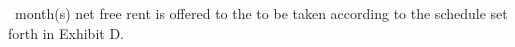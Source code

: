 \monthsFreeRentText\ month(s) net free rent is offered to the \lessee to be taken according to the schedule set forth in Exhibit D.
